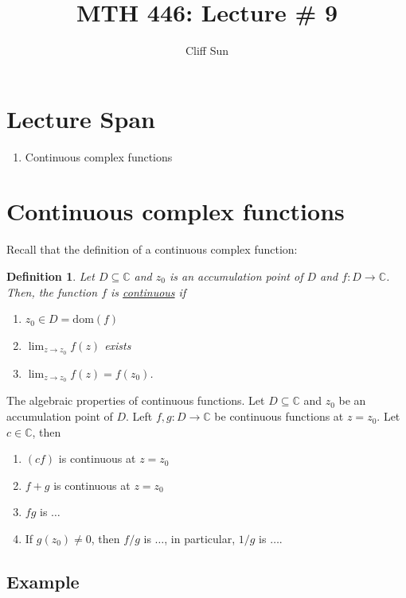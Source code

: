 \documentclass{article}
\title{MTH 446: Lecture \# 9}
\author{Cliff Sun}
\newtheorem{definition}[theorem]{Definition}
\newtheorem{one minute paper}[theorem]{One Minute Paper}
\begin{document}
\maketitle

\section*{Lecture Span}
\begin{enumerate}
    \item Continuous complex functions
\end{enumerate}

\section*{Continuous complex functions}

Recall that the definition of a continuous complex function:

\begin{definition}
    Let $D \subseteq \mathbb{C}$ and $z_0$ is an accumulation point of $D$ and $f: D \rightarrow \mathbb{C}$. Then, the function $f$ is \underline{continuous} if 
    \begin{enumerate}
        \item $z_0 \in D = \text{dom}(f)$
        \item $\lim_{z \rightarrow z_0} f(z)$ exists
        \item $\lim_{z \rightarrow z_0} f(z) = f(z_0)$. 
    \end{enumerate}
\end{definition}

The algebraic properties of continuous functions. Let $D \subseteq \mathbb{C}$ and $z_0$ be an accumulation point of $D$. Left $f,g: D \rightarrow \mathbb{C}$ be continuous functions at $z=z_0$. Let $c \in \mathbb{C}$, then 
\begin{enumerate}
    \item $(cf)$ is continuous at $z=z_0$
    \item $f + g$ is continuous at $z=z_0$
    \item $fg$ is $\dots$
    \item If $g(z_0) \neq 0$, then $f/g$ is $\dots$, in particular, $1/g$ is $\dots$. 
\end{enumerate}

\subsection*{Example}
\end{document}
